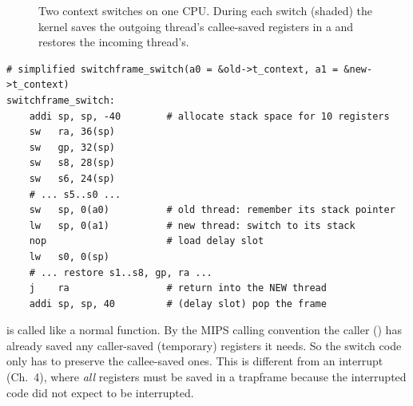 \begin{figure}[H]
\centering
{}
\caption{Two context switches on one CPU. During each switch (shaded) the
kernel saves the outgoing thread's callee-saved registers in a
 and restores the incoming thread's.}
\end{figure}

\begin{lstlisting}[style=mips]
# simplified switchframe_switch(a0 = &old->t_context, a1 = &new->t_context)
switchframe_switch:
    addi sp, sp, -40        # allocate stack space for 10 registers
    sw   ra, 36(sp)
    sw   gp, 32(sp)
    sw   s8, 28(sp)
    sw   s6, 24(sp)
    # ... s5..s0 ...
    sw   sp, 0(a0)          # old thread: remember its stack pointer
    lw   sp, 0(a1)          # new thread: switch to its stack
    nop                     # load delay slot
    lw   s0, 0(sp)
    # ... restore s1..s8, gp, ra ...
    j    ra                 # return into the NEW thread
    addi sp, sp, 40         # (delay slot) pop the frame
\end{lstlisting}

\begin{important}
 is called like a normal function. By the MIPS calling convention the
caller () has already saved any caller-saved (temporary) registers it needs.
So the switch code only has to preserve the callee-saved ones. This is different from an
interrupt (Ch.~4), where \emph{all} registers must be saved in a trapframe because the
interrupted code did not expect to be interrupted.
\end{important}

